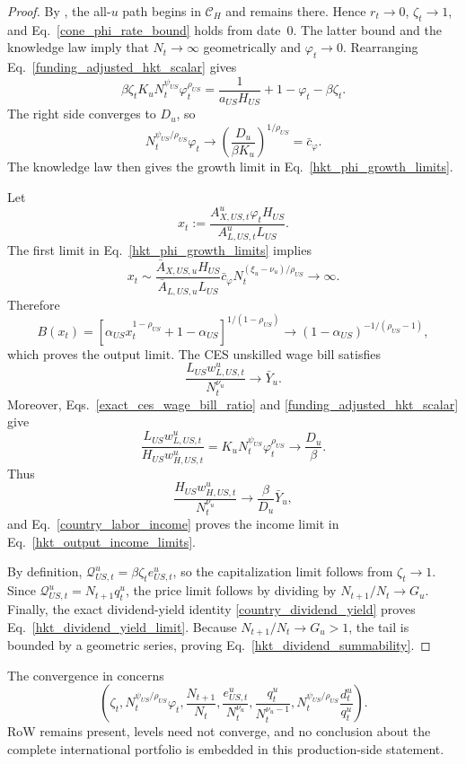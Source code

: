 \documentclass{article}
\def\green#1{#1}%
\begin{document}
\begin{proof}
By \green{}, \green{the all-}$\green{u}$ \green{path begins in} $\green{\mathcal C}_\green{H}$ \green{and remains there}.  \green{Hence} $r_t\to0$, $\zeta_t\to1$, and Eq.~\eqref{cone_phi_rate_bound} holds \green{from date}~\green{0}.  The latter bound and the knowledge law imply that $N_t\to\infty$ geometrically and $\varphi_t\to0$.  Rearranging Eq.~\eqref{funding_adjusted_hkt_scalar} gives
\[
\beta\zeta_tK_uN_t^{\psi_{US}}\varphi_t^{\rho_{US}}
=
\frac{1}{a_{US}H_{US}}+1-\varphi_t-\beta\zeta_t.
\]
The right side converges to $D_u$, so
\[
N_t^{\psi_{US}/\rho_{US}}\varphi_t
\longrightarrow
\left(\frac{D_u}{\beta K_u}\right)^{1/\rho_{US}}
=\bar c_\varphi.
\]
The knowledge law then gives the growth limit in Eq.~\eqref{hkt_phi_growth_limits}.

Let
\[
x_t
:=
\frac{A_{X,US,t}^u\varphi_tH_{US}}
     {A_{L,US,t}^uL_{US}}.
\]
The first limit in Eq.~\eqref{hkt_phi_growth_limits} implies
\[
x_t
\sim
\frac{\bar A_{X,US,u}H_{US}}
     {\bar A_{L,US,u}L_{US}}
\bar c_\varphi
N_t^{(\xi_u-\nu_u)/\rho_{US}}
\longrightarrow\infty.
\]
Therefore
\[
B(x_t)
=
\left[\alpha_{US}x_t^{1-\rho_{US}}+1-\alpha_{US}\right]^{1/(1-\rho_{US})}
\longrightarrow
(1-\alpha_{US})^{-1/(\rho_{US}-1)},
\]
which proves the output limit.  The CES unskilled wage bill satisfies
\[
\frac{L_{US}w_{L,US,t}^u}{N_t^{\nu_u}}
\longrightarrow\bar Y_u.
\]
Moreover, Eqs.~\eqref{exact_ces_wage_bill_ratio} and \eqref{funding_adjusted_hkt_scalar} give
\[
\frac{L_{US}w_{L,US,t}^u}{H_{US}w_{H,US,t}^u}
=K_uN_t^{\psi_{US}}\varphi_t^{\rho_{US}}
\longrightarrow\frac{D_u}{\beta}.
\]
Thus
\[
\frac{H_{US}w_{H,US,t}^u}{N_t^{\nu_u}}
\longrightarrow
\frac{\beta}{D_u}\bar Y_u,
\]
and Eq.~\eqref{country_labor_income} proves the income limit in Eq.~\eqref{hkt_output_income_limits}.

By definition, $\mathcal Q_{US,t}^u=\beta\zeta_te_{US,t}^u$, so the capitalization limit follows from $\zeta_t\to1$.  Since $\mathcal Q_{US,t}^u=N_{t+1}q_t^u$, the price limit follows by dividing by $N_{t+1}/N_t\to G_u$.  Finally, the exact dividend-yield identity \eqref{country_dividend_yield} proves Eq.~\eqref{hkt_dividend_yield_limit}.  Because $N_{t+1}/N_t\to G_u>1$, the tail is bounded by a geometric series, proving Eq.~\eqref{hkt_dividend_summability}.
\end{proof}

The convergence in  concerns
\[
\left(
\zeta_t,
N_t^{\psi_{US}/\rho_{US}}\varphi_t,
\frac{N_{t+1}}{N_t},
\frac{e_{US,t}^u}{N_t^{\nu_u}},
\frac{q_t^u}{N_t^{\nu_u-1}},
N_t^{\psi_{US}/\rho_{US}}\frac{d_t^u}{q_t^u}
\right).
\]
RoW remains present, levels need not converge, and no conclusion about the complete international portfolio is embedded in this production-side statement.
\end{document}
